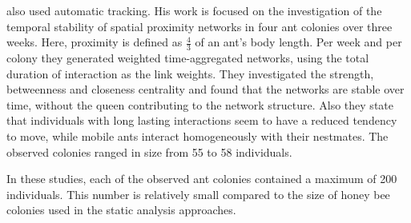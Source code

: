 \textcite{jeanson2012long} also used automatic tracking.
His work is focused on the investigation of the temporal stability of spatial proximity networks in four ant colonies over three weeks.
Here, proximity is defined as $\frac{4}{3}$ of an ant’s body length.
Per week and per colony they generated weighted time-aggregated networks, using the total duration of interaction as the link weights.
They investigated the strength, betweenness and closeness centrality and found that the networks are stable over time, without the queen contributing to the network structure.
Also they state that individuals with long lasting interactions seem to have a reduced tendency to move, while mobile ants interact homogeneously with their nestmates.
The observed colonies ranged in size from 55 to 58 individuals.


In these studies, each of the observed ant colonies contained a maximum of 200 individuals. This number is relatively small compared to the size of honey bee colonies used in the static analysis approaches.